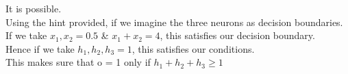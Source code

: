\begin{answer}
    It is possible.\\
    Using the hint provided, if we imagine the three neurons as decision boundaries.\\
    If we take $x_1,x_2 = 0.5$ \& $x_1 + x_2 = 4$, this satisfies our decision boundary.\\
    Hence if we take $h_1,h_2,h_3 = 1$, this satisfies our conditions.\\
    This makes sure that o = 1 only if $h_1+h_2+h_3 \geq 1$
 \end{answer}
